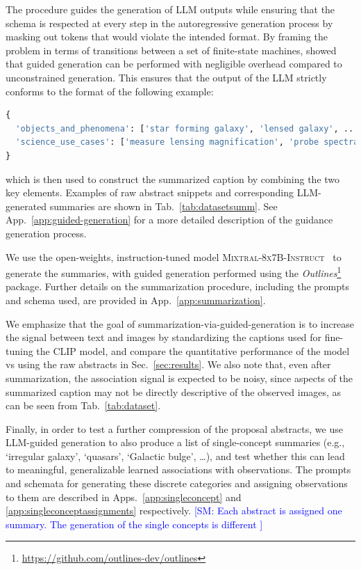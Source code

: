 \documentclass[10pt]{article} %
\newcommand{\package}[1]{\textsl{#1}\xspace}
\newcommand{\SM}[1]{\textcolor{blue}{[SM: #1]}}
\begin{document}
The procedure guides the generation of LLM outputs while ensuring that the schema is respected at every step in the autoregressive generation process by masking out tokens that would violate the intended format.
%
By framing the problem in terms of transitions between a set of finite-state machines, \cite{willard2023efficient} showed that guided generation can be performed with negligible overhead compared to unconstrained generation.
%
This ensures that the output of the LLM strictly conforms to the format of the following example:
\begin{lstlisting}[language=Python]
{
  'objects_and_phenomena': ['star forming galaxy', 'lensed galaxy', ...], 
  'science_use_cases': ['measure lensing magnification', 'probe spectral energy distributions', ...]
}
\end{lstlisting}
which is then used to construct the summarized caption by combining the two key elements.
%
Examples of raw abstract snippets and corresponding LLM-generated summaries are shown in Tab.~\ref{tab:datasetsumm}.
%
See App.~\ref{app:guided-generation} for a more detailed description of the guidance generation process.

We use the open-weights, instruction-tuned model \textsc{Mixtral-8x7B-Instruct}~\citep{jiang2024mixtral} to generate the summaries, with guided generation performed using the \package{Outlines}\footnote{\url{https://github.com/outlines-dev/outlines}} package.
%
Further details on the summarization procedure, including the prompts and schema used, are provided in App.~\ref{app:summarization}.

We emphasize that the goal of summarization-via-guided-generation is to increase the signal between text and images by standardizing the captions used for fine-tuning the CLIP model, and compare the quantitative performance of the model vs using the raw abstracts in Sec.~\ref{sec:results}.
%
We also note that, even after summarization, the association signal is expected to be noisy, since aspects of the summarized caption may not be directly descriptive of the observed images, as can be seen from Tab.~\ref{tab:dataset}.

Finally, in order to test a further compression of the proposal abstracts, we use LLM-guided generation to also produce a list of single-concept summaries (e.g., `irregular galaxy', `quasars', `Galactic bulge', \ldots), and test whether this can lead to meaningful, generalizable learned associations with observations.
%
The prompts and schemata for generating these discrete categories and assigning observations to them are described in Apps.~\ref{app:singleconcept} and \ref{app:singleconceptassignments} respectively. \SM{Each abstract is assigned one summary. The generation of the single concepts is different }
\end{document}
